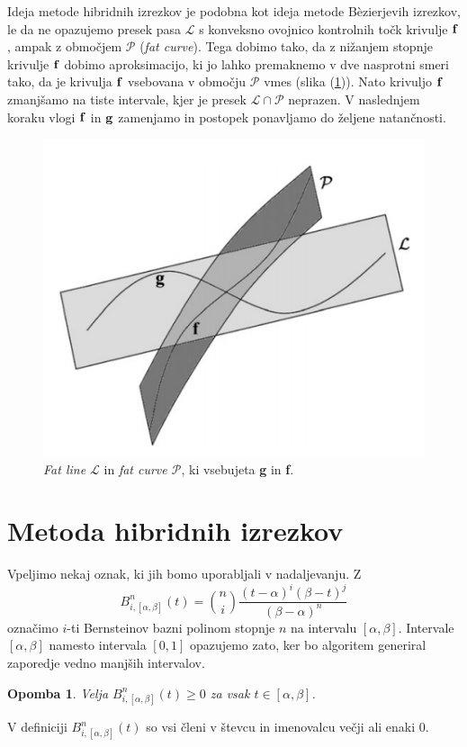 \documentclass[12pt,a4paper, reqno]{amsart}
\newtheorem{opomba}[definicija]{Opomba}
\let\oldref\ref
\renewcommand{\ref}[1]{(\oldref{#1})}
\begin{document}
Ideja metode hibridnih izrezkov je podobna kot ideja metode B\`{e}zierjevih izrezkov, le da ne opazujemo presek pasa $\mathcal{L}$ s konveksno ovojnico kontrolnih točk krivulje ${\bf f}$, ampak z območjem $\mathcal{P}$ ({\em fat curve}). Tega dobimo tako, da z nižanjem stopnje krivulje ${\bf f}$ dobimo aproksimacijo, ki jo lahko premaknemo v dve nasprotni smeri tako, da je krivulja ${\bf f}$ vsebovana v območju $\mathcal{P}$ vmes (slika \ref{slika2}). Nato krivuljo ${\bf f}$ zmanjšamo na tiste intervale, kjer je presek $\mathcal{L}\cap\mathcal{P}$ neprazen. V naslednjem koraku vlogi ${\bf f}$ in ${\bf g}$ zamenjamo in postopek ponavljamo do željene natančnosti.
\begin{figure}[!h]
  \centering
    \includegraphics[width=0.40\linewidth]{2}
  	\caption{{\em Fat line $\mathcal{L}$} in {\em fat curve $\mathcal{P}$}, ki vsebujeta {\bf g} in {\bf f}.}
  	\label{slika2}
\end{figure}
\medskip

\section{Metoda hibridnih izrezkov}
Vpeljimo nekaj oznak, ki jih bomo uporabljali v nadaljevanju. Z 
\begin{equation*}
B_{i,[\alpha,\beta]}^n(t) = \binom{n}{i} \frac{(t-\alpha)^i(\beta - t)^j}{(\beta - \alpha)^n}
\end{equation*}
označimo $i$-ti Bernsteinov bazni polinom stopnje $n$ na intervalu $[\alpha,\beta]$. Intervale $[\alpha,\beta]$ namesto intervala $[0,1]$ opazujemo zato, ker bo algoritem generiral zaporedje vedno manjših intervalov.

\begin{opomba}
Velja $B_{i,[\alpha,\beta]}^n(t) \geq 0$ za vsak $t\in [\alpha,\beta]$.
\end{opomba}
\proof V definiciji $B_{i,[\alpha,\beta]}^n(t)$ so vsi členi v števcu in imenovalcu večji ali enaki $0$.
\endproof
\end{document}
